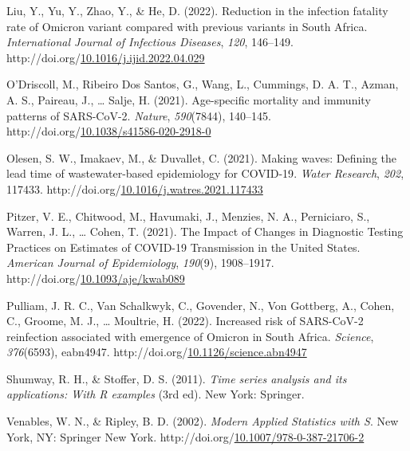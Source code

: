 \documentclass[12pt,twoside]{smiththesis}
\newlength{\cslhangindent}
\newenvironment{CSLReferences}[2] %
 {%
\setlength{\parindent}{0pt}
\ifodd #1 \everypar{\setlength{\hangindent}{\cslhangindent}}\ignorespaces\fi
\ifnum #2 > 0
\setlength{\parskip}{#2\baselineskip}
  \fi
}%
{}
\begin{document}
\begin{CSLReferences}{1}{0}
\leavevmode{}%
Liu, Y., Yu, Y., Zhao, Y., \& He, D. (2022). Reduction in the infection fatality rate of {Omicron} variant compared with previous variants in {South Africa}. \emph{International Journal of Infectious Diseases}, \emph{120}, 146--149. http://doi.org/\href{https://doi.org/10.1016/j.ijid.2022.04.029}{10.1016/j.ijid.2022.04.029}

\leavevmode{}%
O'Driscoll, M., Ribeiro Dos Santos, G., Wang, L., Cummings, D. A. T., Azman, A. S., Paireau, J., \ldots{} Salje, H. (2021). Age-specific mortality and immunity patterns of {SARS-CoV-2}. \emph{Nature}, \emph{590}(7844), 140--145. http://doi.org/\href{https://doi.org/10.1038/s41586-020-2918-0}{10.1038/s41586-020-2918-0}

\leavevmode{}%
Olesen, S. W., Imakaev, M., \& Duvallet, C. (2021). Making waves: {Defining} the lead time of wastewater-based epidemiology for {COVID-19}. \emph{Water Research}, \emph{202}, 117433. http://doi.org/\href{https://doi.org/10.1016/j.watres.2021.117433}{10.1016/j.watres.2021.117433}

\leavevmode{}%
Pitzer, V. E., Chitwood, M., Havumaki, J., Menzies, N. A., Perniciaro, S., Warren, J. L., \ldots{} Cohen, T. (2021). The {Impact} of {Changes} in {Diagnostic Testing Practices} on {Estimates} of {COVID-19 Transmission} in the {United States}. \emph{American Journal of Epidemiology}, \emph{190}(9), 1908--1917. http://doi.org/\href{https://doi.org/10.1093/aje/kwab089}{10.1093/aje/kwab089}

\leavevmode{}%
Pulliam, J. R. C., Van Schalkwyk, C., Govender, N., Von Gottberg, A., Cohen, C., Groome, M. J., \ldots{} Moultrie, H. (2022). Increased risk of {SARS-CoV-2} reinfection associated with emergence of {Omicron} in {South Africa}. \emph{Science}, \emph{376}(6593), eabn4947. http://doi.org/\href{https://doi.org/10.1126/science.abn4947}{10.1126/science.abn4947}

\leavevmode{}%
Shumway, R. H., \& Stoffer, D. S. (2011). \emph{Time series analysis and its applications: With {R} examples} (3rd ed). {New York}: {Springer}.

\leavevmode{}%
Venables, W. N., \& Ripley, B. D. (2002). \emph{Modern {Applied Statistics} with {S}}. {New York, NY}: {Springer New York}. http://doi.org/\href{https://doi.org/10.1007/978-0-387-21706-2}{10.1007/978-0-387-21706-2}


\end{CSLReferences}
\end{document}
